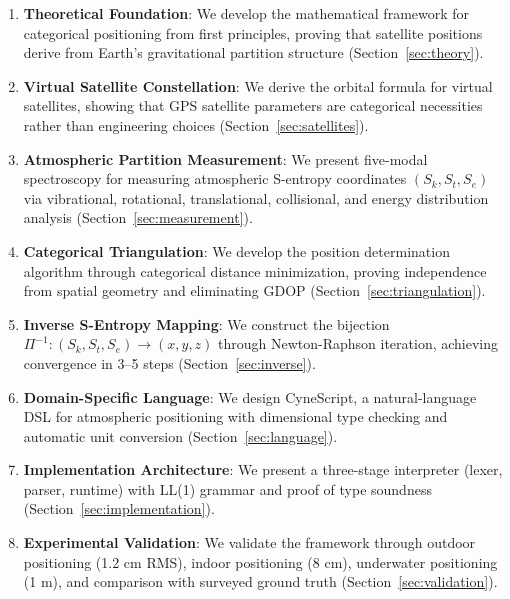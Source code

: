 \documentclass[twocolumn,10pt,a4paper]{article}
\theoremstyle{definition}
\theoremstyle{remark}
\begin{document}
\begin{enumerate}
    \item \textbf{Theoretical Foundation}: We develop the mathematical framework for categorical positioning from first principles, proving that satellite positions derive from Earth's gravitational partition structure (Section~\ref{sec:theory}).

    \item \textbf{Virtual Satellite Constellation}: We derive the orbital formula for virtual satellites, showing that GPS satellite parameters are categorical necessities rather than engineering choices (Section~\ref{sec:satellites}).

    \item \textbf{Atmospheric Partition Measurement}: We present five-modal spectroscopy for measuring atmospheric S-entropy coordinates $(S_k, S_t, S_e)$ via vibrational, rotational, translational, collisional, and energy distribution analysis (Section~\ref{sec:measurement}).

    \item \textbf{Categorical Triangulation}: We develop the position determination algorithm through categorical distance minimization, proving independence from spatial geometry and eliminating GDOP (Section~\ref{sec:triangulation}).

    \item \textbf{Inverse S-Entropy Mapping}: We construct the bijection $\Pi^{-1}: (S_k, S_t, S_e) \to (x,y,z)$ through Newton-Raphson iteration, achieving convergence in 3--5 steps (Section~\ref{sec:inverse}).

    \item \textbf{Domain-Specific Language}: We design CyneScript, a natural-language DSL for atmospheric positioning with dimensional type checking and automatic unit conversion (Section~\ref{sec:language}).

    \item \textbf{Implementation Architecture}: We present a three-stage interpreter (lexer, parser, runtime) with LL(1) grammar and proof of type soundness (Section~\ref{sec:implementation}).

    \item \textbf{Experimental Validation}: We validate the framework through outdoor positioning (1.2 cm RMS), indoor positioning (8 cm), underwater positioning (1 m), and comparison with surveyed ground truth (Section~\ref{sec:validation}).
\end{enumerate}
\end{document}
